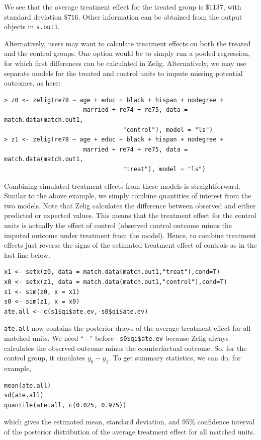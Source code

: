 \documentclass[oneside,letterpaper,titlepage]{article}
\begin{document}
We see that the average treatment effect for the treated group is
$\$1137$, with standard deviation $\$716$.  Other information can be
obtained from the output objects in {\tt s.out1}.

Alternatively, users may want to calculate treatment effects on both
the treated and the control groups.  One option would be to simply
run a pooled regression, for which first differences can be calculated
in Zelig.  Alternatively, we may use separate models for the treated
and control units to impute missing potential outcomes, as here:
\begin{verbatim}
> z0 <- zelig(re78 ~ age + educ + black + hispan + nodegree +
                      married + re74 + re75, data = match.data(match.out1,
                                 "control"), model = "ls")
> z1 <- zelig(re78 ~ age + educ + black + hispan + nodegree +
                      married + re74 + re75, data = match.data(match.out1,
                                 "treat"), model = "ls")
\end{verbatim}
Combining simulated treatment effects from these models is
straightforward.  Similar to the above example, we simply combine
quantities of interest from the two models.  Note that Zelig
calculates the difference between observed and either predicted or
expected values.  This means that the treatment effect for the control
units is actually the effect of control (observed control outcome
minus the imputed outcome under treatment from the model).  Hence, to
combine treatment effects just reverse the signs of the estimated
treatment effect of controls as in the last line below.
\begin{verbatim}
x1 <- setx(z0, data = match.data(match.out1,"treat"),cond=T)
x0 <- setx(z1, data = match.data(match.out1,"control"),cond=T)
s1 <- sim(z0, x = x1)
s0 <- sim(z1, x = x0)
ate.all <- c(s1$qi$ate.ev,-s0$qi$ate.ev)
\end{verbatim}
{\tt ate.all} now contains the posterior draws of the average
treatment effect for all matched units. We need ``$-$'' before
\texttt{-s0\$qi\$ate.ev} because Zelig always calculates the observed
outcome minus the counterfactual outcome. So, for the control group,
it simulates $y_0-y_1$. To get summary statistics, we can do, for
example, 
\begin{verbatim}
mean(ate.all)
sd(ate.all)
quantile(ate.all, c(0.025, 0.975))
\end{verbatim}
which gives the estimated mean, standard deviation, and 95\%
confidence interval of the posterior distribution of the average
treatment effect for all matched units.
\end{document}
